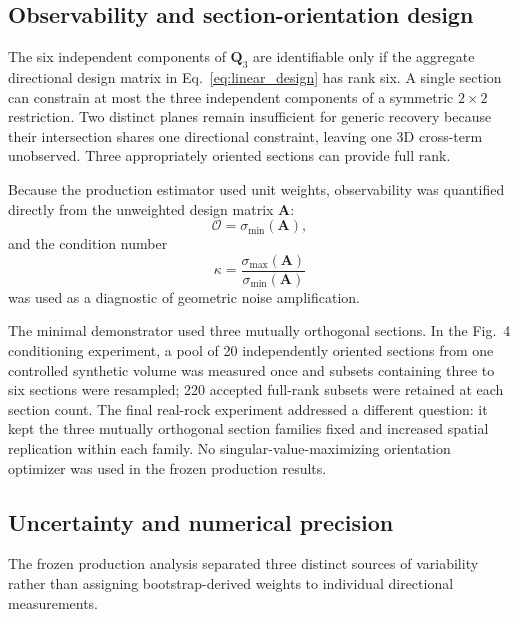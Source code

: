 \documentclass{article}
\begin{document}
\subsection{Observability and section-orientation design}
\label{subsec:observability}

The six independent components of $\bm{Q}_{3}$ are identifiable only if the
aggregate directional design matrix in Eq.~\eqref{eq:linear_design} has rank
six. A single section can constrain at most the three independent components
of a symmetric $2\times2$ restriction. Two distinct planes remain
insufficient for generic recovery because their intersection shares one
directional constraint, leaving one 3D cross-term unobserved. Three
appropriately oriented sections can provide full rank.

Because the production estimator used unit weights, observability was
quantified directly from the unweighted design matrix $\bm{A}$:
\begin{equation}
    \mathcal{O}
    =
    \sigma_{\min}
    \left(
        \bm{A}
    \right),
    \label{eq:observability}
\end{equation}
and the condition number
\begin{equation}
    \kappa
    =
    \frac{
        \sigma_{\max}(\bm{A})
    }{
        \sigma_{\min}(\bm{A})
    }
    \label{eq:condition_number}
\end{equation}
was used as a diagnostic of geometric noise amplification.

The minimal demonstrator used three mutually orthogonal sections. In the
Fig.~4 conditioning experiment, a pool of 20 independently oriented sections
from one controlled synthetic volume was measured once and subsets containing
three to six sections were resampled; 220 accepted full-rank subsets were
retained at each section count. The final real-rock experiment addressed a
different question: it kept the three mutually orthogonal section families
fixed and increased spatial replication within each family. No
singular-value-maximizing orientation optimizer was used in the frozen
production results.

\subsection{Uncertainty and numerical precision}
\label{subsec:uncertainty}

The frozen production analysis separated three distinct sources of variability
rather than assigning bootstrap-derived weights to individual directional
measurements.
\end{document}

